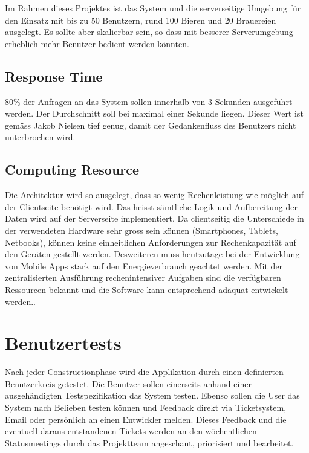 \documentclass[10pt,a4paper]{scrartcl}
\begin{document}
Im Rahmen dieses Projektes ist das System und die serverseitige Umgebung für den Einsatz mit  bis zu 50 Benutzern, rund 100 Bieren und 20 Brauereien ausgelegt. Es sollte aber skalierbar sein, so dass mit besserer Serverumgebung erheblich mehr Benutzer bedient werden könnten.

	\subsection{Response Time}

	80\% der Anfragen an das System sollen innerhalb von 3 Sekunden ausgeführt werden.
	Der Durchschnitt soll bei maximal einer Sekunde liegen. Dieser Wert ist gemäss Jakob Nielsen tief genug, damit der Gedankenfluss des Benutzers nicht unterbrochen wird\cite{nielsen1993usability}.

	\subsection{Computing Resource}

	Die Architektur wird so ausgelegt, dass so wenig Rechenleistung wie möglich auf der Clientseite benötigt wird. Das heisst sämtliche Logik und Aufbereitung der Daten wird auf der Serverseite implementiert. Da clientseitig die Unterschiede in der verwendeten Hardware sehr gross sein können (Smartphones, Tablets, Netbooks), können keine einheitlichen Anforderungen zur Rechenkapazität auf den Geräten gestellt werden. Desweiteren muss heutzutage bei der Entwicklung von Mobile Apps stark auf den Energieverbrauch geachtet werden. Mit der zentralisierten Ausführung rechenintensiver Aufgaben sind die verfügbaren Ressourcen bekannt und die Software kann entsprechend adäquat entwickelt werden..


\section{Benutzertests}
\label{sec:benutzertests}

Nach jeder Constructionphase wird die Applikation durch einen definierten Benutzerkreis getestet. Die Benutzer sollen einerseits anhand einer ausgehändigten Testspezifikation das System testen. Ebenso sollen die User das System nach Belieben testen können und Feedback direkt via Ticketsystem, Email oder persönlich an einen Entwickler melden. Dieses Feedback und die eventuell daraus entstandenen Tickets werden an den wöchentlichen Statusmeetings durch das Projektteam angeschaut, priorisiert und bearbeitet.
\end{document}

